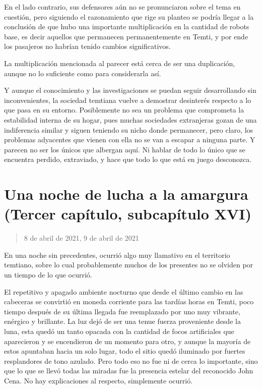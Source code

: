 \documentclass[
  spanish,
]{book}
\begin{document}
En el lado contrario, sus defensores aún no se pronunciaron sobre el tema en cuestión, pero siguiendo el razonamiento que rige su planteo se podría llegar a la conclusión de que hubo una importante multiplicación en la cantidad de robots base, es decir aquellos que permanecen permanentemente en Temti, y por ende los pasajeros no habrían tenido cambios significativos.

La multiplicación mencionada al parecer está cerca de ser una duplicación, aunque no lo suficiente como para considerarla así.

Y aunque el conocimiento y las investigaciones se puedan seguir desarrollando sin inconvenientes, la sociedad temtiana vuelve a demostrar desinterés respecto a lo que pasa en su entorno. Posiblemente no sea un problema que comprometa la estabilidad interna de su hogar, pues muchas sociedades extranjeras gozan de una indiferencia similar y siguen teniendo su nicho donde permanecer, pero claro, los problemas adyacentes que vienen con ella no se van a escapar a ninguna parte. Y parecen no ser los únicos que albergan aquí. Ni hablar de todo lo único que se encuentra perdido, extraviado, y hace que todo lo que está en juego desconozca.

\hypertarget{una-noche-de-lucha-a-la-amargura-tercer-capuxedtulo-subcapuxedtulo-xvi}{%
\section{Una noche de lucha a la amargura (Tercer capítulo, subcapítulo XVI)}\label{una-noche-de-lucha-a-la-amargura-tercer-capuxedtulo-subcapuxedtulo-xvi}}

\begin{quote}
8 de abril de 2021, 9 de abril de 2021
\end{quote}

En una noche sin precedentes, ocurrió algo muy llamativo en el territorio temtiano, sobre lo cual probablemente muchos de los presentes no se olviden por un tiempo de lo que ocurrió.

El repetitivo y apagado ambiente nocturno que desde el último cambio en las cabeceras se convirtió en moneda corriente para las tardías horas en Temti, poco tiempo después de su última llegada fue reemplazado por uno muy vibrante, enérgico y brillante. La luz dejó de ser una tenue fuerza proveniente desde la luna, esta quedó un tanto opacada con la cantidad de focos artificiales que aparecieron y se encendieron de un momento para otro, y aunque la mayoría de estos apuntaban hacia un solo lugar, todo el sitio quedó iluminado por fuertes resplandores de tono azulado.
Pero todo eso no fue ni de cerca lo importante, sino que lo que se llevó todas las miradas fue la presencia estelar del reconocido John Cena. No hay explicaciones al respecto, simplemente ocurrió.
\end{document}

